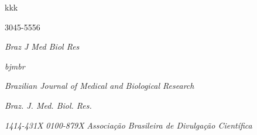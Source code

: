 \documentclass[10pt,a4paper]{article}
\begin{document}
\printtitle 
\printauthor

kkk

3045-5556

      \renewenvironment{journalmeta}{\begin{tcolorbox}}{\end{tcolorbox}}
             \renewcommand{\journalidtypenlmstyle}{\itshape}
             \renewcommand{\journalidtypenlm}[1]{{\journalidtypenlmstyle #1}}
             \renewcommand{\journalidtypeublisheridstyle}{\itshape}
             \renewcommand{\journalidtypeublisherid}[1]{{\journalidtypeublisheridstyle #1}}
      \renewenvironment{journaltitlegroup}{}{}
                  \renewcommand{\journaltitlestyle}{\itshape}
                  \renewcommand{\journaltitle}[1]{{\journaltitlestyle #1}}
                  \renewcommand{\abbrevjournaltitlepublisherstyle}{\itshape}
                  \renewcommand{\abbrevjournaltitlepublisher}[1]{{\abbrevjournaltitlepublisherstyle #1}}
            \renewcommand{\issnepubstyle}{\itshape}
            \renewcommand{\issnepub}[1]{{\issnepubstyle #1}}
            \renewcommand{\issnppubstyle}{\itshape}
            \renewcommand{\issnppub}[1]{{\issnppubstyle #1}}
            \renewenvironment{publisher}{}{}
                  \renewcommand{\publishernamestyle}{\itshape}
                  \renewcommand{\publishername}[1]{{\publishernamestyle #1}}

      \begin{journalmeta}
            \journalidtypenlm{Braz J Med Biol Res}

            \journalidtypeublisherid{bjmbr}

            \begin{journaltitlegroup}
           
                 \journaltitle{Brazilian Journal of Medical and Biological Research}
      
                 \abbrevjournaltitlepublisher{Braz. J. Med. Biol. Res.}
           
            \end{journaltitlegroup}
           \issnepub{1414-431X}
           \issnppub{0100-879X}
                \publishername{Associação Brasileira de Divulgação Científica}
      \end{journalmeta}

%
\end{document}
